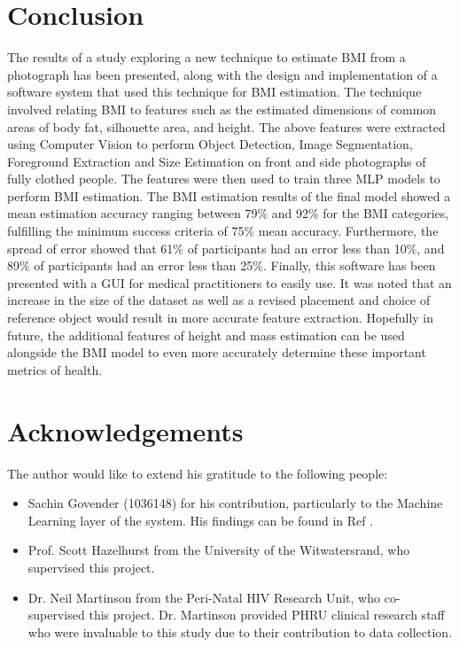\documentclass[conference]{IEEEtran}
\begin{document}
\section{Conclusion}
The results of a study exploring a new technique to estimate BMI from a photograph has been presented, along with the design and implementation of a software system that used this technique for BMI estimation.
The technique involved relating BMI to features such as the estimated dimensions of common areas of body fat, silhouette area, and height.
The above features were extracted using Computer Vision to perform Object Detection, Image Segmentation, Foreground Extraction and Size Estimation on front and side photographs of fully clothed people.
The features were then used to train three MLP models to perform BMI estimation.
The BMI estimation results of the final model showed a mean estimation accuracy ranging between 79\% and 92\% for the BMI categories, fulfilling the minimum success criteria of 75\% mean accuracy.
Furthermore, the spread of error showed that 61\% of participants had an error less than 10\%, and 89\% of participants had an error less than 25\%.
Finally, this software has been presented with a GUI for medical practitioners to easily use.
It was noted that an increase in the size of the dataset as well as a revised placement and choice of reference object would result in more accurate feature extraction.
Hopefully in future, the additional features of height and mass estimation can be used alongside the BMI model to even more accurately determine these important metrics of health.

\section{Acknowledgements}
The author would like to extend his gratitude to the following people:
\begin{itemize}
    \item Sachin Govender (1036148) for his contribution, particularly to the Machine Learning layer of the system.
    His findings can be found in Ref \cite{sachin}.
    \item Prof. Scott Hazelhurst from the University of the Witwatersrand, who supervised this project.
    \item Dr. Neil Martinson from the Peri-Natal HIV Research Unit, who co-supervised this project.
    Dr. Martinson provided PHRU clinical research staff who were invaluable to this study due to their contribution to data collection.
\end{itemize}



\end{document}
